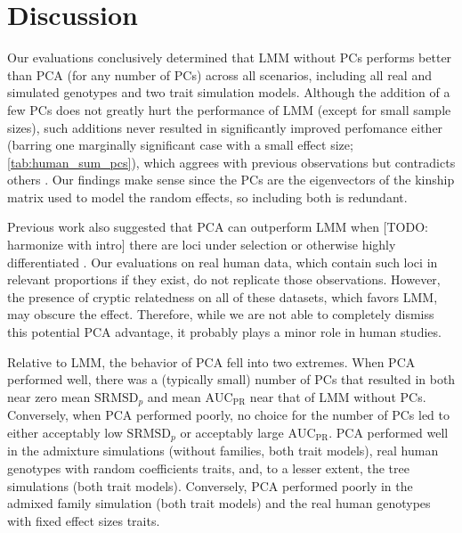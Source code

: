 \documentclass[11pt]{article}
\newcommand{\rmsd}{\text{SRMSD}_p}
\newcommand{\auc}{\text{AUC}_\text{PR}}
\begin{document}
\section{Discussion}

Our evaluations conclusively determined that LMM without PCs performs better than PCA (for any number of PCs) across all scenarios, including all real and simulated genotypes and two trait simulation models.
Although the addition of a few PCs does not greatly hurt the performance of LMM (except for small sample sizes), such additions never resulted in significantly improved perfomance either (barring one marginally significant case with a small effect size; \cref{tab:human_sum_pcs}), which aggrees with previous observations \citep{liu_controlling_2011} but contradicts others \citep{zhao_arabidopsis_2007, price_new_2010}.
Our findings make sense since the PCs are the eigenvectors of the kinship matrix used to model the random effects, so including both is redundant.

Previous work also suggested that PCA can outperform LMM when [TODO: harmonize with intro] there are loci under selection or otherwise highly differentiated \citep{price_new_2010, wu_comparison_2011, yang_advantages_2014}.
Our evaluations on real human data, which contain such loci in relevant proportions if they exist, do not replicate those observations.
However, the presence of cryptic relatedness on all of these datasets, which favors LMM, may obscure the effect.
Therefore, while we are not able to completely dismiss this potential PCA advantage, it probably plays a minor role in human studies.

Relative to LMM, the behavior of PCA fell into two extremes.
When PCA performed well, there was a (typically small) number of PCs that resulted in both near zero mean $\rmsd$ and mean $\auc$ near that of LMM without PCs.
Conversely, when PCA performed poorly, no choice for the number of PCs led to either acceptably low $\rmsd$ or acceptably large $\auc$.
PCA performed well in the admixture simulations (without families, both trait models), real human genotypes with random coefficients traits, and, to a lesser extent, the tree simulations (both trait models).
Conversely, PCA performed poorly in the admixed family simulation (both trait models) and the real human genotypes with fixed effect sizes traits.
\end{document}
